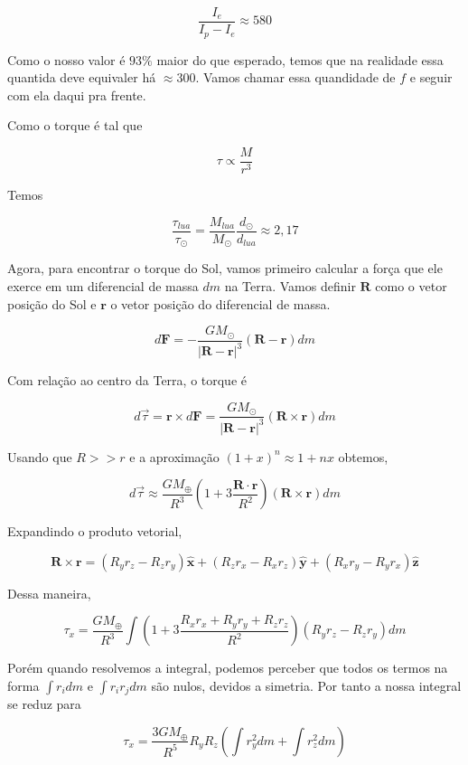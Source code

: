 \documentclass[11pt]{article}
\begin{document}
\begin{pproblem}
\begin{pssolution*}{}{}
\begin{alternativas}
            \[\boxed{\frac{I_e}{I_p-I_e} \approx 580}\]

            Como o nosso valor é \(93\%\) maior do que esperado, temos que na realidade essa quantida deve equivaler há \(\approx 300\). Vamos chamar essa quandidade de \(f\) e seguir com ela daqui pra frente.

            \item Como o torque é tal que
            
            \[\tau \propto \frac{M}{r^3}\]

            Temos 

            \[\frac{\tau_{lua}}{\tau_\odot} = \frac{M_{lua}}{M_\odot}\frac{d_\odot}{d_{lua}}\approx 2,17\]

            Agora, para encontrar o torque do Sol, vamos primeiro calcular a força que ele exerce em um diferencial de massa \(dm\) na Terra. Vamos definir \(\mathbf R\) como o vetor posição do Sol e \(\mathbf r\) o vetor posição do diferencial de massa.

            \[d\mathbf F = -\frac{GM_\odot}{|\mathbf R - \mathbf r|^3}(\mathbf R - \mathbf r)dm\]

            Com relação ao centro da Terra, o torque é 

            \[d\vec\tau = \mathbf r \times d\mathbf F = \frac{GM_\odot}{|\mathbf R - \mathbf r|^3}(\mathbf R \times \mathbf r)dm\]

            Usando que \(R>>r\) e a aproximação \((1+x)^n\approx 1+nx\) obtemos, 

            \[d\vec\tau \approx \frac{GM_\oplus}{R^3}\left(1+3\frac{\mathbf R \cdot \mathbf r}{R^2}\right)(\mathbf R \times \mathbf r )dm\]

            Expandindo o produto vetorial, 

            \[\mathbf R \times \mathbf r = (R_yr_z - R_z r_y )\mathbf{\hat x} + (R_zr_x - R_xr_z)\mathbf {\hat y} + (R_xr_y - R_yr_x) \mathbf{\hat z}\]

            Dessa maneira, 

            \[\tau_x = \frac{GM_\oplus}{R^3}\int \left(1+3\frac{R_xr_x+R_yr_y+R_zr_z}{R^2}\right)(R_yr_z-R_zr_y)dm\]

            Porém quando resolvemos a integral, podemos perceber que todos os termos na forma \(\int r_i dm \) e \(\int r_ir_jdm\) são nulos, devidos a simetria. Por tanto a nossa integral se reduz para 

            \[\tau_x = \frac{3GM_\oplus}{R^5}R_yR_z\left(\int r_y^2dm + \int r_z^2dm\right)\]


\end{alternativas}
\end{pssolution*}
\end{pproblem}
\end{document}
